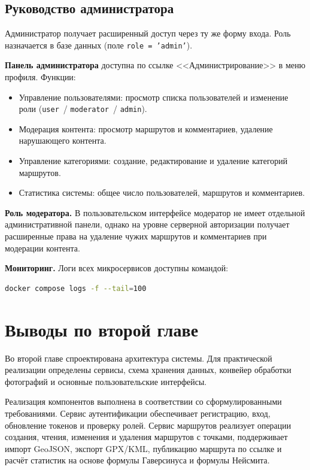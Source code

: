 \subsection{Руководство администратора}

Администратор получает расширенный доступ через ту же форму входа. Роль назначается в базе данных (поле \texttt{role = 'admin'}).

\textbf{Панель администратора} доступна по ссылке <<Администрирование>> в меню профиля. Функции:

\begin{itemize}
  \item Управление пользователями: просмотр списка пользователей и изменение роли (\texttt{user}~/ \texttt{moderator}~/ \texttt{admin}).
  \item Модерация контента: просмотр маршрутов и комментариев, удаление нарушающего контента.
  \item Управление категориями: создание, редактирование и удаление категорий маршрутов.
  \item Статистика системы: общее число пользователей, маршрутов и комментариев.
\end{itemize}

\textbf{Роль модератора.} В пользовательском интерфейсе модератор не имеет отдельной административной панели, однако на уровне серверной авторизации получает расширенные права на удаление чужих маршрутов и комментариев при модерации контента.

\textbf{Мониторинг.} Логи всех микросервисов доступны командой:
\begin{lstlisting}[language=bash, caption={Просмотр логов системы}]
docker compose logs -f --tail=100
\end{lstlisting}

\section*{Выводы по второй главе}

Во второй главе спроектирована архитектура системы. Для практической реализации
определены сервисы, схема хранения данных, конвейер обработки фотографий и
основные пользовательские интерфейсы.

Реализация компонентов выполнена в соответствии со сформулированными
требованиями. Сервис аутентификации обеспечивает регистрацию, вход, обновление
токенов и проверку ролей. Сервис маршрутов реализует операции создания, чтения,
изменения и удаления маршрутов с точками, поддерживает импорт GeoJSON, экспорт
GPX/KML, публикацию маршрута по ссылке и расчёт статистик на основе формулы
Гаверсинуса и формулы Нейсмита.

